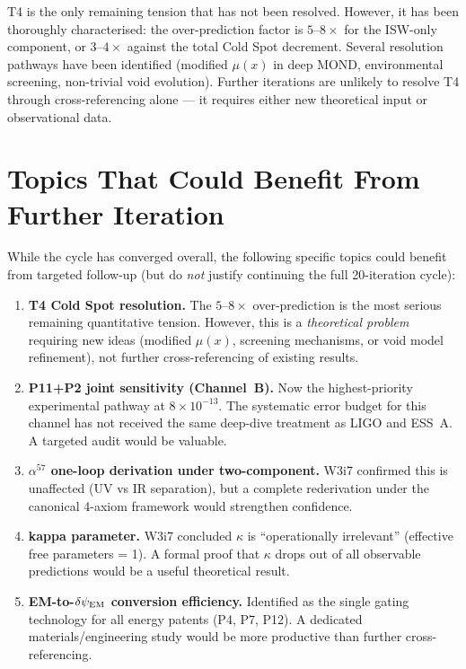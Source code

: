 \documentclass[11pt]{article}
\newcommand{\ee}[1]{\times 10^{#1}}
\begin{document}
T4 is the only remaining tension that has not been resolved. However,
it has been thoroughly characterised: the over-prediction factor is
$5$--$8\times$ for the ISW-only component, or $3$--$4\times$ against
the total Cold Spot decrement. Several resolution pathways have been
identified (modified $\mu(x)$ in deep MOND, environmental screening,
non-trivial void evolution). Further iterations are unlikely to resolve
T4 through cross-referencing alone --- it requires either new theoretical
input or observational data.


\section{Topics That Could Benefit From Further Iteration}
\label{sec:further}

While the cycle has converged overall, the following specific topics
could benefit from targeted follow-up (but do \emph{not} justify
continuing the full 20-iteration cycle):

\begin{enumerate}
\item \textbf{T4 Cold Spot resolution.} The $5$--$8\times$
  over-prediction is the most serious remaining quantitative tension.
  However, this is a \emph{theoretical problem} requiring new ideas
  (modified $\mu(x)$, screening mechanisms, or void model refinement),
  not further cross-referencing of existing results.

\item \textbf{P11+P2 joint sensitivity (Channel~B).} Now the
  highest-priority experimental pathway at $8\ee{-13}$. The systematic
  error budget for this channel has not received the same deep-dive
  treatment as LIGO and ESS~A. A targeted audit would be valuable.

\item \textbf{$\alpha^{57}$ one-loop derivation under two-component.}
  W3i7 confirmed this is unaffected (UV vs IR separation), but a
  complete rederivation under the canonical 4-axiom framework would
  strengthen confidence.

\item \textbf{kappa parameter.} W3i7 concluded $\kappa$ is
  ``operationally irrelevant'' (effective free parameters = 1).
  A formal proof that $\kappa$ drops out of all observable predictions
  would be a useful theoretical result.

\item \textbf{EM-to-$\delta\psi_{\rm EM}$ conversion efficiency.}
  Identified as the single gating technology for all energy patents
  (P4, P7, P12). A dedicated materials/engineering study would be
  more productive than further cross-referencing.
\end{enumerate}
\end{document}

